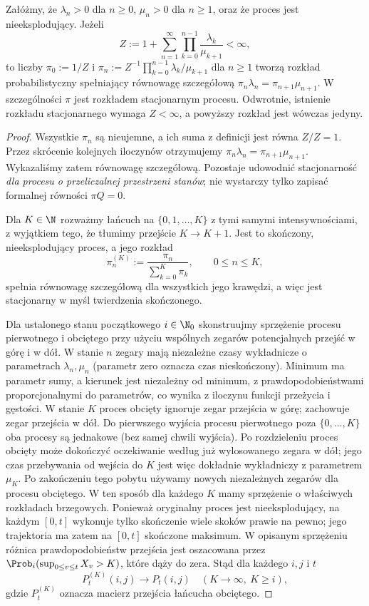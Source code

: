 \begin{stwierdzenie}
Załóżmy, że $\lambda_n>0$ dla $n\ge0$,
$\mu_n>0$ dla $n\ge1$, oraz że proces jest nieeksplodujący.
Jeżeli
\[
Z:=1+\sum_{n=1}^\infty
\prod_{k=0}^{n-1}\frac{\lambda_k}{\mu_{k+1}}<\infty,
\]
to liczby
$\pi_0:=1/Z$ i
$\pi_n:=Z^{-1}\prod_{k=0}^{n-1}\lambda_k/\mu_{k+1}$
dla $n\ge1$ tworzą rozkład probabilistyczny spełniający
równowagę szczegółową
$\pi_n\lambda_n=\pi_{n+1}\mu_{n+1}$.
W szczególności $\pi$ jest rozkładem stacjonarnym procesu.
Odwrotnie, istnienie rozkładu stacjonarnego wymaga $Z<\infty$,
a powyższy rozkład jest wówczas jedyny.
\end{stwierdzenie}
\begin{proof}
Wszystkie $\pi_n$ są nieujemne, a ich suma z definicji
jest równa $Z/Z=1$. Przez skrócenie kolejnych iloczynów
otrzymujemy $\pi_n\lambda_n=\pi_{n+1}\mu_{n+1}$.
Wykazaliśmy zatem równowagę szczegółową.
Pozostaje udowodnić stacjonarność \emph{dla procesu
o przeliczalnej przestrzeni stanów}; nie wystarczy tylko zapisać
formalnej równości $\pi Q=0$.

Dla $K\in\N$ rozważmy łańcuch na $\{0,1,\ldots,K\}$
z tymi samymi intensywnościami, z wyjątkiem tego,
że tłumimy przejście $K\to K+1$.
Jest to skończony, nieeksplodujący proces,
a jego rozkład
\[
\pi_n^{(K)}:=\frac{\pi_n}{\sum_{k=0}^K\pi_k},
\qquad 0\le n\le K,
\]
spełnia równowagę szczegółową dla wszystkich jego krawędzi,
a więc jest stacjonarny w myśl twierdzenia skończonego.

Dla ustalonego stanu początkowego $i\in\N_0$ skonstruujmy
sprzężenie procesu pierwotnego i obciętego przy użyciu
wspólnych zegarów potencjalnych przejść w górę i w dół.
W stanie $n$ zegary mają niezależne czasy wykładnicze
o parametrach $\lambda_n,\mu_n$ (parametr zero oznacza
czas nieskończony). Minimum ma parametr sumy, a kierunek
jest niezależny od minimum, z prawdopodobieństwami
proporcjonalnymi do parametrów, co wynika z iloczynu
funkcji przeżycia i gęstości. W stanie $K$ proces
obcięty ignoruje zegar przejścia w górę; zachowuje
zegar przejścia w dół. Do pierwszego wyjścia procesu pierwotnego poza
$\{0,\ldots,K\}$ oba procesy są jednakowe (bez
samej chwili wyjścia). Po rozdzieleniu proces
obcięty może dokończyć oczekiwanie według już
wylosowanego zegara w dół; jego czas przebywania
od wejścia do $K$ jest więc dokładnie wykładniczy
z parametrem $\mu_K$. Po zakończeniu tego pobytu
używamy nowych niezależnych zegarów dla procesu
obciętego. W ten sposób dla każdego $K$ mamy sprzężenie
o właściwych rozkładach brzegowych. Ponieważ oryginalny
proces jest nieeksplodujący,
na każdym $[0,t]$ wykonuje tylko skończenie wiele skoków
prawie na pewno; jego trajektoria ma zatem na $[0,t]$
skończone maksimum. W opisanym sprzężeniu różnica
prawdopodobieństw przejścia jest oszacowana przez
$\Prob_i(\sup_{0\le v\le t}X_v>K)$, które dąży do zera.
Stąd dla każdego $i,j$ i $t$
\[
P_t^{(K)}(i,j)\longrightarrow P_t(i,j)
\quad (K\to\infty,\ K\ge i),
\]
gdzie $P_t^{(K)}$ oznacza macierz przejścia łańcucha
obciętego.


\end{proof}
